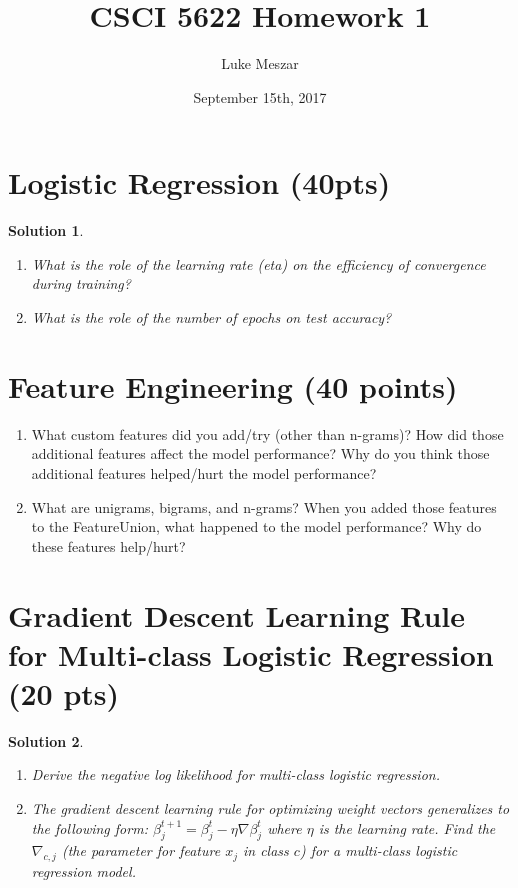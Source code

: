 \documentclass[12pt]{article}
\author{Luke Meszar}
\date{September 15th, 2017}
\title{CSCI 5622 Homework 1}
\newtheorem*{solution*}{Solution}
\theoremstyle{definition}
\begin{document}
	\thispagestyle{empty}
	
	\newlength{\boxlength}\setlength{\boxlength}{\textwidth}
	\addtolength{\boxlength}{-4mm}
	
	\begin{center}
	\end{center}
	\section{Logistic Regression (40pts)}																																									
	\begin{solution*}\leavevmode
		\begin{enumerate}[label=\arabic*.,font=\upshape]
			\item \textnormal{What is the role of the learning rate (eta) on the efficiency of convergence during training?}
			\item \textnormal{What is the role of the number of epochs on test accuracy?}
		\end{enumerate}
	\end{solution*}
	\section{Feature Engineering (40 points)}
	\begin{enumerate}
		\item \textnormal{What custom features did you add/try (other than n-grams)? How did those additional features
			affect the model performance? Why do you think those additional features helped/hurt
			the model performance?}
		\item \textnormal{What are unigrams, bigrams, and n-grams? When you added those features to the FeatureUnion,
			what happened to the model performance? Why do these features help/hurt?}
	\end{enumerate}
\section{ Gradient Descent Learning Rule for Multi-class Logistic Regression (20 pts)}
	\begin{solution*}
		\begin{enumerate}
			\item \textnormal{Derive the negative log likelihood for multi-class logistic regression.}
			\item \textnormal{The gradient descent learning rule for optimizing weight vectors generalizes to the following form: $\beta^{t+1}_j = \beta^t_j - \eta \nabla \beta^t_j$ where $\eta$ is the learning rate. Find the $\nabla_{c,j}$ (the parameter for
				feature $x_j$ in class $c$) for a multi-class logistic regression model.}
		\end{enumerate}
	\end{solution*}
\end{document}
